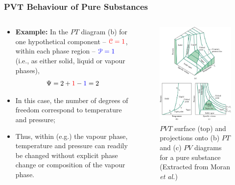 \documentclass[10pt,compress,handout,ignorenonframetext]{beamer}
\begin{document}
\begin{frame}
 \frametitle{PVT Behaviour of Pure Substances}
 \begin{columns}
  \begin{column}[l]{0.55\linewidth}
\begin{itemize}
\item <1-> {\bf Example:} In the $PT$ diagram (b) for one hypothetical component -- $\textcolor{red}{\mathcal{C}=1}$, within each phase region -- $\textcolor{blue}{\mathcal{P}=1}$ (i.e., as either solid, liquid or vapour phases),
\begin{displaymath}
\Psi = 2 + \textcolor{red}{1} - \textcolor{blue}{1} = 2
\end{displaymath}
\item <2-> In this case, the number of degrees of freedom correspond to temperature and pressure;
\item <3-> Thus, within (e.g.) the vapour phase, temperature and pressure can readily be changed without explicit phase change or composition of the vapour phase.
\end{itemize}
  \end{column}
  \begin{column}[l]{0.45\linewidth}
   \begin{figure}%
    \begin{center}
     \includegraphics[width=4.cm,clip]{./Pics/PVT_Surface.jpg}
    \end{center}
\caption{$PVT$ surface (top) and projections onto (b) $PT$ and (c) $PV$ diagrams for a pure substance (Extracted from Moran {\it et al.})}
   \end{figure}    
  \end{column}
 \end{columns}
\end{frame}


\end{document}
